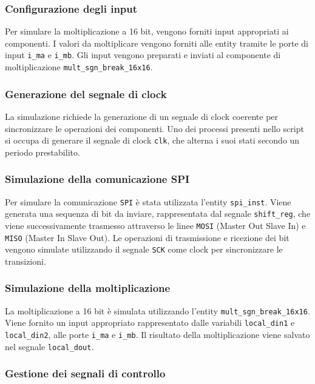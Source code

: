\documentclass[titlepage]{report}
\begin{document}
			\subsubsection{Configurazione degli input}

				Per simulare la moltiplicazione a 16 bit, vengono forniti input appropriati ai componenti. I valori da moltiplicare vengono forniti alle entity tramite le porte di input \texttt{i\_ma} e \texttt{i\_mb}. Gli input vengono preparati e inviati al componente di moltiplicazione \texttt{mult\_sgn\_break\_16x16}.

			\subsubsection{Generazione del segnale di clock}

				La simulazione richiede la generazione di un segnale di clock coerente per sincronizzare le operazioni dei componenti. Uno dei processi presenti nello script si occupa di generare il segnale di clock \texttt{clk}, che alterna i suoi stati secondo un periodo prestabilito.

			\subsubsection{Simulazione della comunicazione SPI}

				Per simulare la comunicazione \texttt{SPI} è stata utilizzata l'entity \texttt{spi\_inst}. Viene generata una sequenza di bit da inviare, rappresentata dal segnale \texttt{shift\_reg}, che viene successivamente trasmesso attraverso le linee \texttt{MOSI} (Master Out Slave In) e \texttt{MISO} (Master In Slave Out). Le operazioni di trasmissione e ricezione dei bit vengono simulate utilizzando il segnale \texttt{SCK} come clock per sincronizzare le transizioni.

			\subsubsection{Simulazione della moltiplicazione}

				La moltiplicazione a 16 bit è simulata utilizzando l'entity \texttt{mult\_sgn\_break\_16x16}. Viene fornito un input appropriato rappresentato dalle variabili \texttt{local\_din1} e \texttt{local\_din2}, alle porte \texttt{i\_ma} e \texttt{i\_mb}. Il risultato della moltiplicazione viene salvato nel segnale \texttt{local\_dout}.

			\subsubsection{Gestione dei segnali di controllo}
\end{document}
